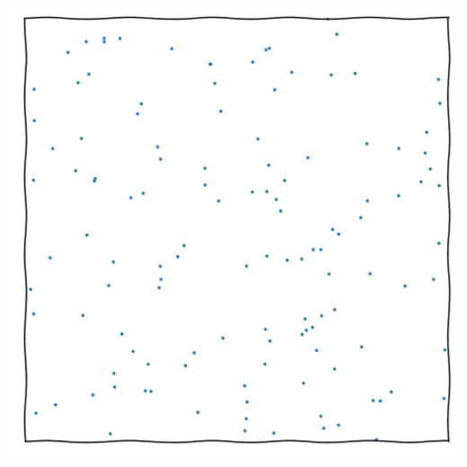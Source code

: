 \documentclass[aspectratio=169]{beamer}
\begin{document}
\begin{frame}
\begin{columns}
        \includegraphics[width=\textwidth,page=6]{figures/himmelblau}
    \end{columns}
\end{frame}
\end{document}
